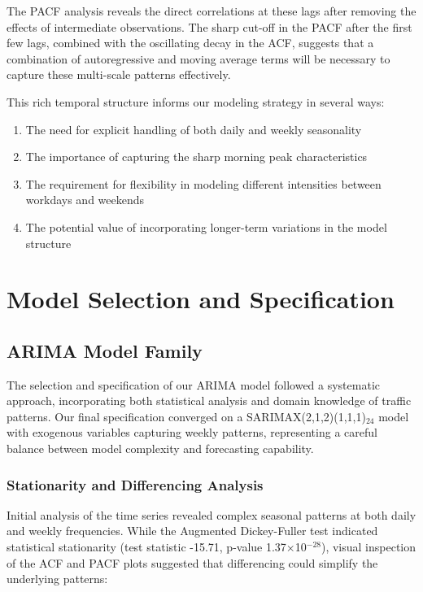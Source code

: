 \documentclass{article}
\begin{document}
The PACF analysis reveals the direct correlations at these lags after removing the effects of intermediate observations. The sharp cut-off in the PACF after the first few lags, combined with the oscillating decay in the ACF, suggests that a combination of autoregressive and moving average terms will be necessary to capture these multi-scale patterns effectively.

This rich temporal structure informs our modeling strategy in several ways:
\begin{enumerate}
    \item The need for explicit handling of both daily and weekly seasonality
    \item The importance of capturing the sharp morning peak characteristics
    \item The requirement for flexibility in modeling different intensities between workdays and weekends
    \item The potential value of incorporating longer-term variations in the model structure
\end{enumerate}

\section{Model Selection and Specification}

\subsection{ARIMA Model Family}

The selection and specification of our ARIMA model followed a systematic approach, incorporating both statistical analysis and domain knowledge of traffic patterns. Our final specification converged on a SARIMAX(2,1,2)(1,1,1)$_{24}$ model with exogenous variables capturing weekly patterns, representing a careful balance between model complexity and forecasting capability.

\subsubsection{Stationarity and Differencing Analysis}
Initial analysis of the time series revealed complex seasonal patterns at both daily and weekly frequencies. While the Augmented Dickey-Fuller test indicated statistical stationarity (test statistic -15.71, p-value 1.37×10$^{-28}$), visual inspection of the ACF and PACF plots suggested that differencing could simplify the underlying patterns:
\end{document}
